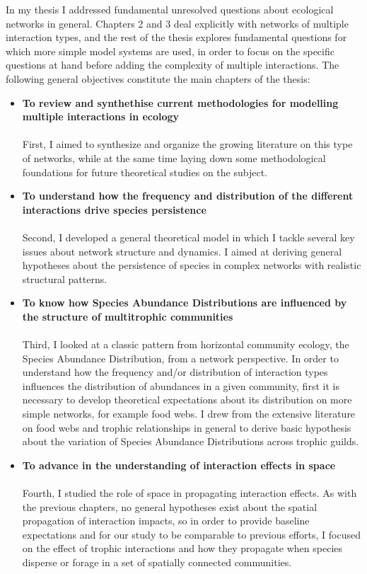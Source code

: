 In my thesis I addressed fundamental unresolved questions about ecological networks in general. Chapters 2 and 3 deal explicitly with networks of multiple interaction types, and the rest of the thesis explores fundamental questions for which more simple model systems are used, in order to focus on the specific questions at hand before adding the complexity of multiple interactions. The following general objectives constitute the main chapters of the thesis:

\begin{itemize}
\item \textbf{To review and synthethise current methodologies for modelling multiple interactions in ecology}\\ \\
First, I aimed to synthesize and organize the growing literature on this type of networks, while at the same time laying down some methodological foundations for future theoretical studies on the subject.

\item \textbf{To understand how the frequency and distribution of the different interactions drive species persistence}\\ \\
Second, I developed a general theoretical model in which I tackle several key issues about network structure and dynamics. I aimed at deriving general hypotheses about the persistence of species in complex networks with realistic structural patterns.

\item \textbf{To know how Species Abundance Distributions are influenced by the structure of multitrophic communities}\\ \\
Third, I looked at a classic pattern from horizontal community ecology, the Species Abundance Distribution, from a network perspective. In order to understand how the frequency and/or distribution of interaction types influences the distribution of abundances in a given community, first it is necessary to develop theoretical expectations about its distribution on more simple networks, for example food webs. I drew from the extensive literature on food webs and trophic relationships in general to derive basic hypothesis about the variation of Species Abundance Distributions across trophic guilds.

\item \textbf{To advance in the understanding of interaction effects in space}\\ \\
Fourth, I studied the role of space in propagating interaction effects. As with the previous chapters, no general hypotheses exist about the spatial propagation of interaction impacts, so in order to provide baseline expectations and for our study to be comparable to previous efforts, I focused on the effect of trophic interactions and how they propagate when species disperse or forage in a set of spatially connected communities.


\end{itemize}

